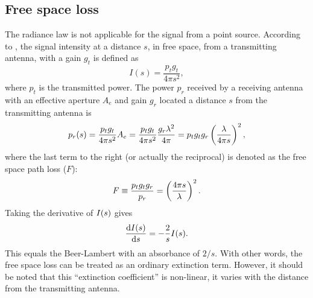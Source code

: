 \subsection{Free space loss}
\label{sec:radiolinks:ppath}
The radiance law is not applicable for the signal from a point source.
According to \citet{ippolito:satco:08}, the signal intensity at a distance
\(s\), in free space, from a transmitting antenna, with a gain \(g_{t}\) is
defined as
\begin{equation}
 I(s)=\frac{p_{t}g_{t}}{4\pi s^{2}},
\end{equation}
where \(p_{t}\) is the transmitted power. The power \(p_{r}\) received by a
receiving antenna with an effective aperture \(A_{e}\) and gain \(g_{r}\)
located a distance \(s\) from the transmitting antenna is
\begin{equation}
\label{eq:fsl}
p_{r}(s)=\frac{p_{t}g_{t}}{4\pi s^{2}}A_{e}=\frac{p_{t}g_{t}}{4\pi s^{2}}
\frac{g_{r}\lambda^{2}}{4\pi}=
p_{t}g_{t}g_{r}\left(\frac{\lambda}{4\pi s} \right)^{2},
\end{equation}
where the last term  
to the right (or actually the reciprocal) is denoted as the
free space path loss (\(F\)):
\begin{equation}
F\equiv\frac{p_{t}g_{t}g_{r}}{p_{r}}=\left(\frac{4\pi s}{\lambda}\right)^{2}.
\end{equation}
Taking the derivative of \(I(s)\) gives
\begin{equation}
\label{eq:fsplarts}
 \frac{\mathrm{d}I(s)}{\mathrm{d} s}=-\frac{2}{s}I(s).
\end{equation}
This equals the Beer-Lambert with an absorbance of $2/s$. With other words, the
free space loss can be treated as an ordinary extinction term. However, it
should be noted that this ``extinction coefficient'' is non-linear, it varies
with the distance from the transmitting antenna. 




